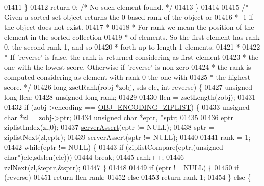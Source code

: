 \begin{DoxyCode}
01411     \}
01412     \textcolor{keywordflow}{return} 0; \textcolor{comment}{/* No such element found. */}
01413 \}
01414 
01415 \textcolor{comment}{/* Given a sorted set object returns the 0-based rank of the object or}
01416 \textcolor{comment}{ * -1 if the object does not exist.}
01417 \textcolor{comment}{ *}
01418 \textcolor{comment}{ * For rank we mean the position of the element in the sorted collection}
01419 \textcolor{comment}{ * of elements. So the first element has rank 0, the second rank 1, and so}
01420 \textcolor{comment}{ * forth up to length-1 elements.}
01421 \textcolor{comment}{ *}
01422 \textcolor{comment}{ * If 'reverse' is false, the rank is returned considering as first element}
01423 \textcolor{comment}{ * the one with the lowest score. Otherwise if 'reverse' is non-zero}
01424 \textcolor{comment}{ * the rank is computed considering as element with rank 0 the one with}
01425 \textcolor{comment}{ * the highest score. */}
01426 \textcolor{keywordtype}{long} zsetRank(robj *zobj, sds ele, \textcolor{keywordtype}{int} reverse) \{
01427     \textcolor{keywordtype}{unsigned} \textcolor{keywordtype}{long} llen;
01428     \textcolor{keywordtype}{unsigned} \textcolor{keywordtype}{long} rank;
01429 
01430     llen = zsetLength(zobj);
01431 
01432     \textcolor{keywordflow}{if} (zobj->encoding == \hyperlink{server_8h_aabf064ede983103f1fd0df2086e84eee}{OBJ\_ENCODING\_ZIPLIST}) \{
01433         \textcolor{keywordtype}{unsigned} \textcolor{keywordtype}{char} *zl = zobj->ptr;
01434         \textcolor{keywordtype}{unsigned} \textcolor{keywordtype}{char} *eptr, *sptr;
01435 
01436         eptr = ziplistIndex(zl,0);
01437         \hyperlink{server_8h_a88114b5169b4c382df6b56506285e56a}{serverAssert}(eptr != NULL);
01438         sptr = ziplistNext(zl,eptr);
01439         \hyperlink{server_8h_a88114b5169b4c382df6b56506285e56a}{serverAssert}(sptr != NULL);
01440 
01441         rank = 1;
01442         \textcolor{keywordflow}{while}(eptr != NULL) \{
01443             \textcolor{keywordflow}{if} (ziplistCompare(eptr,(\textcolor{keywordtype}{unsigned} \textcolor{keywordtype}{char}*)ele,sdslen(ele)))
01444                 \textcolor{keywordflow}{break};
01445             rank++;
01446             zzlNext(zl,&eptr,&sptr);
01447         \}
01448 
01449         \textcolor{keywordflow}{if} (eptr != NULL) \{
01450             \textcolor{keywordflow}{if} (reverse)
01451                 \textcolor{keywordflow}{return} llen-rank;
01452             \textcolor{keywordflow}{else}
01453                 \textcolor{keywordflow}{return} rank-1;
01454         \} \textcolor{keywordflow}{else} \{

\end{DoxyCode}
